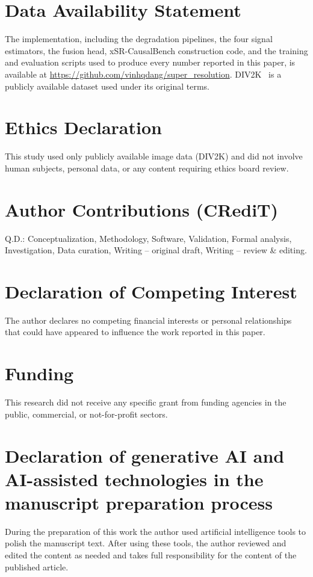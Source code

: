 \documentclass[review]{elsarticle}
\begin{document}
\section*{Data Availability Statement}
The implementation, including the degradation pipelines, the four signal estimators, the fusion head, xSR-CausalBench construction code, and the training and evaluation scripts used to produce every number reported in this paper, is available at \url{https://github.com/vinhqdang/super_resolution}. DIV2K~\citep{agustsson2017div2k} is a publicly available dataset used under its original terms.

\section*{Ethics Declaration}
This study used only publicly available image data (DIV2K) and did not involve human subjects, personal data, or any content requiring ethics board review.

\section*{Author Contributions (CRediT)}
Q.D.: Conceptualization, Methodology, Software, Validation, Formal analysis, Investigation, Data curation, Writing -- original draft, Writing -- review \& editing.

\section*{Declaration of Competing Interest}
The author declares no competing financial interests or personal relationships that could have appeared to influence the work reported in this paper.

\section*{Funding}
This research did not receive any specific grant from funding agencies in the public, commercial, or not-for-profit sectors.

\section*{Declaration of generative AI and AI-assisted technologies in the manuscript preparation process}
During the preparation of this work the author used artificial intelligence tools to polish the manuscript text. After using these tools, the author reviewed and edited the content as needed and takes full responsibility for the content of the published article.


\end{document}

